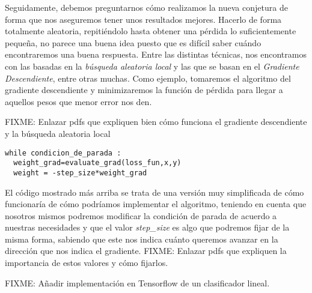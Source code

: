 Seguidamente, debemos preguntarnos cómo realizamos la nueva conjetura de forma que nos aseguremos tener unos resultados mejores. Hacerlo de forma totalmente aleatoria, repitiéndolo hasta obtener una pérdida lo suficientemente pequeña, no parece una buena idea puesto que es difícil saber cuándo encontraremos una buena respuesta. Entre las distintas técnicas, nos encontramos con las basadas en la \emph{búsqueda aleatoria local} y las que se basan en el \emph{Gradiente Descendiente}, entre otras muchas. Como ejemplo, tomaremos el algoritmo del gradiente descendiente y minimizaremos la función de pérdida para llegar a aquellos pesos que menor error nos den.\newline

FIXME: Enlazar pdfs que expliquen bien cómo funciona el gradiente descendiente y la búsqueda aleatoria local \newline
\lstset{language=Python}
\begin{lstlisting}[frame=single]
while condicion_de_parada :
  weight_grad=evaluate_grad(loss_fun,x,y)
  weight = -step_size*weight_grad

\end{lstlisting}

El código mostrado más arriba se trata de una versión muy simplificada de cómo funcionaría de cómo podríamos implementar el algoritmo, teniendo en cuenta que nosotros mismos podremos modificar la condición de parada de acuerdo a nuestras necesidades y que el valor \emph{step\_size} es algo que podremos fijar de la misma forma, sabiendo que este nos indica cuánto queremos avanzar en la dirección que nos indica el gradiente. FIXME: Enlazar pdfs que expliquen la importancia de estos valores y cómo fijarlos.\newline

FIXME: Añadir implementación en Tensorflow de un clasificador lineal.

